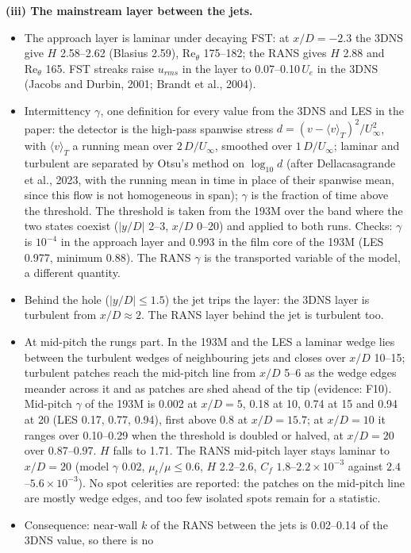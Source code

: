 \documentclass[10pt]{article}
\begin{document}
\textbf{(iii) The mainstream layer between the jets.}
\begin{itemize}
\item The approach layer is laminar under decaying FST: at $x/D=-2.3$ the 3DNS give $H$ 2.58--2.62 (Blasius
  2.59), $\mathrm{Re}_\theta$ 175--182; the RANS gives $H$ 2.88 and $\mathrm{Re}_\theta$ 165. FST streaks raise
  $u_{rms}$ in the layer to 0.07--0.10\,$U_e$ in the 3DNS (Jacobs and Durbin, 2001; Brandt et al., 2004).
\item Intermittency $\gamma$, one definition for every value from the 3DNS and LES in the paper: the detector is
  the high-pass spanwise stress $d=(v-\langle v\rangle_T)^2/U_\infty^2$, with $\langle v\rangle_T$ a running mean
  over $2\,D/U_\infty$, smoothed over $1\,D/U_\infty$; laminar and turbulent are separated by Otsu's method on
  $\log_{10}d$ (after Dellacasagrande et al., 2023, with the running mean in time in place of their spanwise
  mean, since this flow is not homogeneous in span); $\gamma$ is the fraction of time above the threshold. The
  threshold is taken from the 193M over the band where the two states coexist ($|y/D|$ 2--3, $x/D$ 0--20) and
  applied to both runs. Checks: $\gamma$ is $10^{-4}$ in the approach layer and 0.993 in the film core of the
  193M (LES 0.977, minimum 0.88). The RANS $\gamma$ is the transported variable of the model, a different
  quantity.
\item Behind the hole ($|y/D|\le1.5$) the jet trips the layer: the 3DNS layer is turbulent from $x/D\approx2$.
  The RANS layer behind the jet is turbulent too.
\item At mid-pitch the rungs part. In the 193M and the LES a laminar wedge lies between the turbulent wedges of
  neighbouring jets and closes over $x/D$ 10--15; turbulent patches reach the mid-pitch line from $x/D$ 5--6 as
  the wedge edges meander across it and as patches are shed ahead of the tip (evidence: F10). Mid-pitch $\gamma$
  of the 193M is 0.002 at $x/D=5$, 0.18 at 10, 0.74 at 15 and 0.94 at 20 (LES 0.17, 0.77, 0.94), first above 0.8
  at $x/D=15.7$; at $x/D=10$ it ranges over 0.10--0.29 when the threshold is doubled or halved, at $x/D=20$ over
  0.87--0.97. $H$ falls to 1.71. The RANS mid-pitch layer stays laminar to $x/D=20$ (model $\gamma$ 0.02,
  $\mu_t/\mu\le0.6$, $H$ 2.2--2.6, $C_f$ $1.8$--$2.2\times10^{-3}$ against $2.4$--$5.6\times10^{-3}$). No spot
  celerities are reported: the patches on the mid-pitch line are mostly wedge edges, and too few isolated spots
  remain for a statistic.
\item Consequence: near-wall $k$ of the RANS between the jets is 0.02--0.14 of the 3DNS value, so there is no

\end{itemize}
\end{document}
